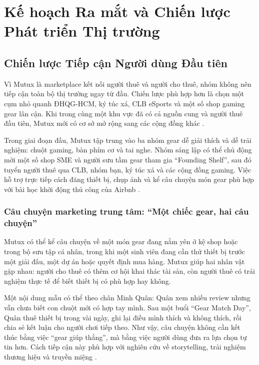 \section{Kế hoạch Ra mắt và Chiến lược Phát triển Thị trường}

\subsection{Chiến lược Tiếp cận Người dùng Đầu tiên}

Vì Mutux là marketplace kết nối người thuê và người cho thuê, nhóm không nên tiếp cận toàn bộ thị trường ngay từ đầu. Chiến lược phù hợp hơn là chọn một cụm nhỏ quanh ĐHQG-HCM, ký túc xá, CLB eSports và một số shop gaming gear lân cận. Khi trong cùng một khu vực đã có cả nguồn cung và người thuê đầu tiên, Mutux mới có cơ sở mở rộng sang các cộng đồng khác \cite{rochetTirole2003,chen2021coldstart}.

Trong giai đoạn đầu, Mutux tập trung vào ba nhóm gear dễ giải thích và dễ trải nghiệm: chuột gaming, bàn phím cơ và tai nghe. Nhóm sáng lập có thể chủ động mời một số shop SME và người sưu tầm gear tham gia ``Founding Shelf'', sau đó tuyển người thuê qua CLB, nhóm bạn, ký túc xá và các cộng đồng gaming. Việc hỗ trợ trực tiếp cách đăng thiết bị, chụp ảnh và kể câu chuyện món gear phù hợp với bài học khởi động thủ công của Airbnb \cite{graham2013scale}.

\subsubsection{Câu chuyện marketing trung tâm: ``Một chiếc gear, hai câu chuyện''}

Mutux có thể kể câu chuyện về một món gear đang nằm yên ở kệ shop hoặc trong bộ sưu tập cá nhân, trong khi một sinh viên đang cần thử thiết bị trước một giải đấu, một dự án hoặc quyết định mua hàng. Mutux giúp hai nhân vật gặp nhau: người cho thuê có thêm cơ hội khai thác tài sản, còn người thuê có trải nghiệm thực tế để biết thiết bị có phù hợp hay không.

Một nội dung mẫu có thể theo chân Minh Quân: Quân xem nhiều review nhưng vẫn chưa biết con chuột mới có hợp tay mình. Sau một buổi ``Gear Match Day'', Quân thuê thiết bị trong vài ngày, ghi lại điều mình thích và không thích, rồi chia sẻ kết luận cho người chơi tiếp theo. Như vậy, câu chuyện không cần kết thúc bằng việc ``gear giúp thắng'', mà bằng việc người dùng đưa ra lựa chọn tự tin hơn. Cách tiếp cận này phù hợp với nghiên cứu về storytelling, trải nghiệm thương hiệu và truyền miệng \cite{escalas2004narrative,brakus2009brandexperience,nielsen2021trust}.

